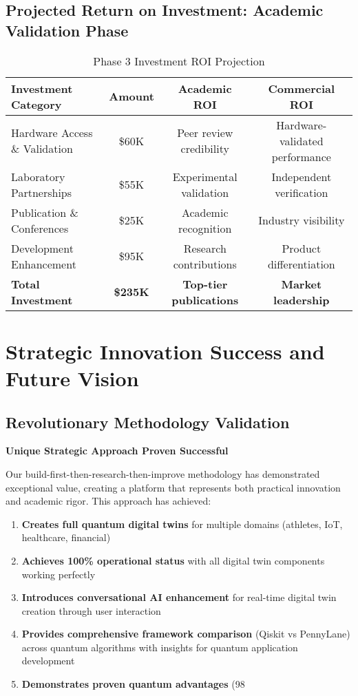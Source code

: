 \documentclass[12pt,a4paper]{article}
\begin{document}
\subsection{Projected Return on Investment: Academic Validation Phase}

\begin{table}[H]
\centering
\caption{Phase 3 Investment ROI Projection}
\begin{tabular}{|l|c|c|c|}
\hline
\textbf{Investment Category} & \textbf{Amount} & \textbf{Academic ROI} & \textbf{Commercial ROI} \\
\hline
Hardware Access \& Validation & \$60K & Peer review credibility & Hardware-validated performance \\
\hline
Laboratory Partnerships & \$55K & Experimental validation & Independent verification \\
\hline
Publication \& Conferences & \$25K & Academic recognition & Industry visibility \\
\hline
Development Enhancement & \$95K & Research contributions & Product differentiation \\
\hline
\textbf{Total Investment} & \textbf{\$235K} & \textbf{Top-tier publications} & \textbf{Market leadership} \\
\hline
\end{tabular}
\end{table}

\section{Strategic Innovation Success and Future Vision}

\subsection{Revolutionary Methodology Validation}

\textcolor{successgreen}{\textbf{Unique Strategic Approach Proven Successful}}

Our build-first-then-research-then-improve methodology has demonstrated exceptional value, creating a platform that represents both practical innovation and academic rigor. This approach has achieved:

\begin{enumerate}
    \item \textbf{Creates full quantum digital twins} for multiple domains (athletes, IoT, healthcare, financial)
    \item \textbf{Achieves 100\% operational status} with all digital twin components working perfectly
    \item \textbf{Introduces conversational AI enhancement} for real-time digital twin creation through user interaction
    \item \textbf{Provides comprehensive framework comparison} (Qiskit vs PennyLane) across quantum algorithms with insights for quantum application development
    \item \textbf{Demonstrates proven quantum advantages} (98%
\end{enumerate}
\end{document}
